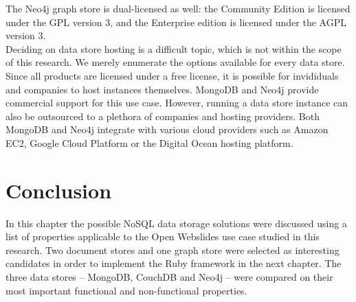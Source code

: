 The Neo4j graph store is dual-licensed as well: the Community Edition is licensed under the GPL version 3, and the Enterprise edition is licensed under the AGPL version 3.\\
Deciding on data store hosting is a difficult topic, which is not within the scope of this research.
We merely enumerate the options available for every data store.
Since all products are licensed under a free license, it is possible for invididuals and companies to host instances themselves.
MongoDB and Neo4j provide commercial support for this use case.
However, running a data store instance can also be outsourced to a plethora of companies and hosting providers.
Both MongoDB and Neo4j integrate with various cloud providers such as Amazon EC2, Google Cloud Platform or the Digital Ocean hosting platform.\\

\section{Conclusion}
\label{sec:data-stores-conclusion}

In this chapter the possible NoSQL data storage solutions were discussed using a list of properties applicable to the Open Webslides use case studied in this research.
Two document stores and one graph store were selected as interesting candidates in order to implement the Ruby framework in the next chapter.
The three data stores -- MongoDB, CouchDB and Neo4j -- were compared on their most important functional and non-functional properties.
